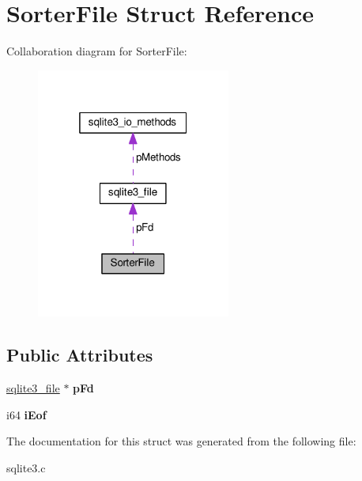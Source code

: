 \hypertarget{structSorterFile}{}\section{Sorter\+File Struct Reference}
\label{structSorterFile}


Collaboration diagram for Sorter\+File\+:\nopagebreak
\begin{figure}[H]
\begin{center}
\leavevmode
\includegraphics[width=181pt]{structSorterFile__coll__graph}
\end{center}
\end{figure}
\subsection*{Public Attributes}
\begin{DoxyCompactItemize}
\item 
\hyperlink{structsqlite3__file}{sqlite3\+\_\+file} $\ast$ {\bfseries p\+Fd}\hypertarget{structSorterFile_afa23123282380b8d04b943479cabadef}{}\label{structSorterFile_afa23123282380b8d04b943479cabadef}

\item 
i64 {\bfseries i\+Eof}\hypertarget{structSorterFile_a5c5f37fc8b5c432d8bf30eb6e40f7823}{}\label{structSorterFile_a5c5f37fc8b5c432d8bf30eb6e40f7823}

\end{DoxyCompactItemize}


The documentation for this struct was generated from the following file\+:\begin{DoxyCompactItemize}
\item 
sqlite3.\+c\end{DoxyCompactItemize}
